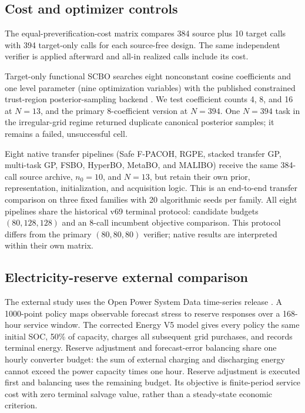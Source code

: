 \subsection{Cost and optimizer controls}

The equal-preverification-cost matrix compares 384 source plus 10 target calls
with 394 target-only calls for each source-free design.  The same independent
verifier is applied afterward and all-in realized calls include its cost.

Target-only functional SCBO searches eight nonconstant cosine coefficients
and one level parameter (nine optimization variables) with the
published constrained trust-region posterior-sampling backend
\citep{BalandatEtAl2020,ErikssonPoloczek2021}.  We test coefficient counts
4, 8, and 16 at $N=13$, and the primary 8-coefficient version at $N=394$.
One $N=394$ task in the irregular-grid regime returned duplicate canonical
posterior samples; it remains a failed, unsuccessful cell.

Eight native transfer pipelines (Safe F-PACOH, RGPE, stacked transfer GP,
multi-task GP, FSBO, HyperBO, MetaBO, and MALIBO) receive the same 384-call
source archive, $n_0=10$, and $N=13$, but retain their own
prior, representation, initialization, and acquisition logic.  This is an
end-to-end transfer comparison on three fixed families with 20 algorithmic
seeds per family.  All eight pipelines share the historical v69 terminal
protocol: candidate budgets $(80,128,128)$ and an 8-call incumbent objective
comparison.  This protocol differs from the primary $(80,80,80)$ verifier;
native results are interpreted within their own matrix.

\subsection{Electricity-reserve external comparison}

The external study uses the Open Power System Data time-series release
\citep{OPSD2020}.  A 1000-point policy maps observable forecast stress to
reserve responses over a 168-hour service window.  The corrected Energy V5
model gives every policy the same initial SOC, 50\% of capacity, charges all
subsequent grid purchases, and records terminal energy.  Reserve adjustment
and forecast-error balancing share one hourly converter budget: the sum of
external charging and discharging energy cannot exceed the power capacity
times one hour.  Reserve adjustment is executed first and balancing uses the
remaining budget.  Its objective is
finite-period service cost with zero terminal salvage value, rather than a
steady-state economic criterion.

